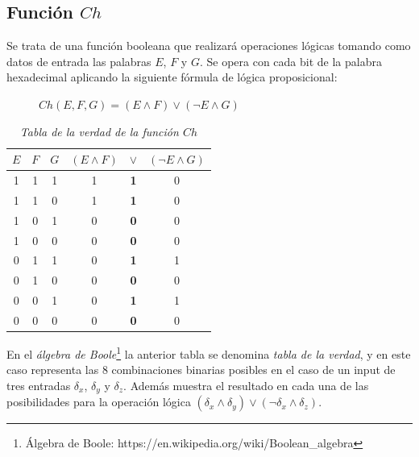 \documentclass{article}
\begin{document}
    \subsection{Función $Ch$}
        Se trata de una función booleana que realizará operaciones lógicas tomando como datos de entrada las palabras $E$, $F$ y $G$. Se opera con cada bit de la palabra hexadecimal aplicando la siguiente fórmula de lógica proposicional:
            \begin{figure}[H]
            \centering
                $Ch(E, F, G) = (E \land F) \lor (\lnot E \land G)$
            \end{figure}
            \begin{table}[H]
            \centering
            \begin{tabular}{| c c c | c c c |} 
                \hline
                $E$ & $F$ & $G$ & $(E \land F)$ & $\lor$ & $(\lnot E \land G)$ \\
                \hline
                1 & 1 & 1 & 1 & \textbf1 & 0 \\
                1 & 1 & 0 & 1 & \textbf1 & 0 \\
                1 & 0 & 1 & 0 & \textbf0 & 0 \\
                1 & 0 & 0 & 0 & \textbf0 & 0 \\
                0 & 1 & 1 & 0 & \textbf1 & 1 \\
                0 & 1 & 0 & 0 & \textbf0 & 0 \\
                0 & 0 & 1 & 0 & \textbf1 & 1 \\
                0 & 0 & 0 & 0 & \textbf0 & 0 \\
                \hline
            \end{tabular}
            \caption{\textit{Tabla de la verdad de la función $Ch$}}
            \label{table:1}
            \end{table}
        En el \textit{álgebra de Boole}\footnote{Álgebra de Boole: https://en.wikipedia.org/wiki/Boolean\_algebra} la anterior tabla se denomina \textit{tabla de la verdad}, y en este caso representa las 8 combinaciones binarias posibles en el caso de un input de tres entradas $\delta_{x}$, $\delta_{y}$ y $\delta_{z}$. Además muestra el resultado en cada una de las posibilidades para la operación lógica $(\delta_{x} \land \delta_{y}) \lor (\lnot \delta_{x} \land \delta_{z})$.
        
\end{document}
